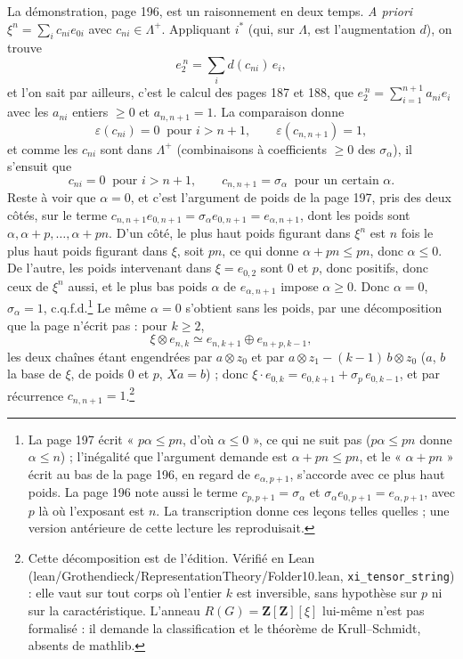 \documentclass[11pt,a4paper]{article}
\begin{document}
La démonstration, page 196, est un raisonnement en deux temps. \emph{A priori} $\xi^{n} = \sum_{i} c_{ni}e_{0i}$ avec
$c_{ni} \in \Lambda^{+}$. Appliquant $i^{*}$ (qui, sur $\Lambda$, est
l'augmentation $d$), on trouve
\[
e_{2}^{\,n} = \sum_{i} d(c_{ni})\,e_{i} ,
\]
et l'on sait par ailleurs, c'est le calcul des pages 187 et 188, que
$e_{2}^{\,n} = \sum_{i=1}^{n+1}a_{ni}e_{i}$ avec les $a_{ni}$ entiers
$\geqslant 0$ et $a_{n,n+1} = 1$. La comparaison donne
\[
\varepsilon(c_{ni}) = 0 \ \text{ pour } i > n+1 ,
\qquad \varepsilon(c_{n,n+1}) = 1 ,
\]
et comme les $c_{ni}$ sont dans $\Lambda^{+}$ (combinaisons à coefficients
$\geqslant 0$ des $\sigma_{\alpha}$), il s'ensuit que
\[
c_{ni} = 0 \ \text{ pour } i > n+1 ,
\qquad c_{n,n+1} = \sigma_{\alpha} \ \text{ pour un certain } \alpha .
\]
Reste à voir que $\alpha = 0$, et c'est l'argument de poids de la page 197,
pris des deux côtés, sur le terme $c_{n,n+1}e_{0,n+1} = \sigma_{\alpha}
e_{0,n+1} = e_{\alpha,n+1}$, dont les poids sont $\alpha, \alpha + p, \ldots,
\alpha + pn$. D'un côté, le plus haut poids figurant dans $\xi^{n}$ est $n$
fois le plus haut poids figurant dans $\xi$, soit $pn$, ce qui donne $\alpha +
pn \leqslant pn$, donc $\alpha \leqslant 0$. De l'autre, les poids
intervenant dans $\xi = e_{0,2}$ sont $0$ et $p$, donc positifs, donc ceux de
$\xi^{n}$ aussi, et le plus bas poids $\alpha$ de $e_{\alpha,n+1}$ impose
$\alpha \geqslant 0$. Donc $\alpha = 0$, $\sigma_{\alpha} = 1$,
c.q.f.d.\footnote{La page 197 écrit « $p\alpha \leqslant pn$, d'où $\alpha
\leqslant 0$ », ce qui ne suit pas ($p\alpha \leqslant pn$ donne $\alpha
\leqslant n$) ; l'inégalité que l'argument demande est $\alpha + pn
\leqslant pn$, et le « $\alpha + pn$ » écrit au bas de la page 196, en
regard de $e_{\alpha,p+1}$, s'accorde avec ce plus haut poids. La page 196 note aussi le
terme $c_{p,p+1} = \sigma_{\alpha}$ et $\sigma_{\alpha}e_{0,p+1} =
e_{\alpha,p+1}$, avec $p$ là où l'exposant est $n$. La transcription donne ces
leçons telles quelles ; une version antérieure de cette lecture les
reproduisait.} Le même $\alpha = 0$ s'obtient sans les poids, par une
décomposition que la page n'écrit pas : pour $k \geqslant 2$,
\[
\xi \otimes e_{n,k} \simeq e_{n,k+1} \oplus e_{n+p,k-1} ,
\]
les deux chaînes étant engendrées par $a \otimes z_{0}$ et par $a \otimes
z_{1} - (k-1)\, b \otimes z_{0}$ ($a$, $b$ la base de $\xi$, de poids $0$ et
$p$, $Xa = b$) ; donc $\xi \cdot e_{0,k} = e_{0,k+1} + \sigma_{p}\, e_{0,k-1}$,
et par récurrence $c_{n,n+1} = 1$.\footnote{Cette décomposition est de
l'édition. Vérifié en Lean (lean/Grothendieck/RepresentationTheory/Folder10.lean,
\texttt{xi\_tensor\_string}) : elle vaut sur tout corps où l'entier $k$ est inversible,
sans hypothèse sur $p$ ni sur la caractéristique. L'anneau $R(G) =
\mathbf{Z}[\mathbf{Z}][\xi]$ lui-même n'est pas formalisé : il demande la
classification et le théorème de Krull--Schmidt, absents de mathlib.}
\end{document}

